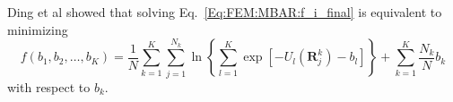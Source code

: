 Ding et al\cite{DingJCTC2019} showed that solving Eq.~\ref{Eq:FEM:MBAR:f_i_final} is equivalent to minimizing
\begin{equation}
    f(b_1,b_2,\dots,b_K)=\frac{1}{N}\sum_{k=1}^{K}\sum_{j=1}^{N_k}\ln{\left\{\sum_{l=1}^{K}\exp{\left[-U_l(\mathbf{R}_j^{k})-b_l\right]}\right\}}+\sum_{k=1}^{K}\frac{N_k}{N}b_k
\end{equation}
with respect to $b_k$.
